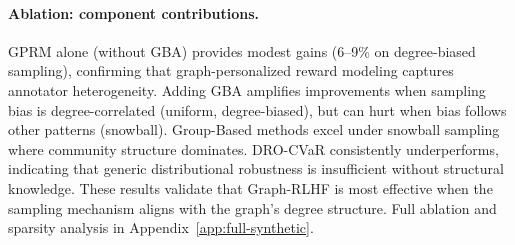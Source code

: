 \documentclass{article}
\theoremstyle{plain}
\theoremstyle{definition}
\theoremstyle{remark}
\begin{document}
\paragraph{Ablation: component contributions.}
GPRM alone (without GBA) provides modest gains (6--9\% on degree-biased sampling), confirming that graph-personalized reward modeling captures annotator heterogeneity. Adding GBA amplifies improvements when sampling bias is degree-correlated (uniform, degree-biased), but can hurt when bias follows other patterns (snowball). Group-Based methods excel under snowball sampling where community structure dominates. DRO-CVaR consistently underperforms, indicating that generic distributional robustness is insufficient without structural knowledge. These results validate that Graph-RLHF is most effective when the sampling mechanism aligns with the graph's degree structure. Full ablation and sparsity analysis in Appendix~\ref{app:full-synthetic}.
\end{document}
